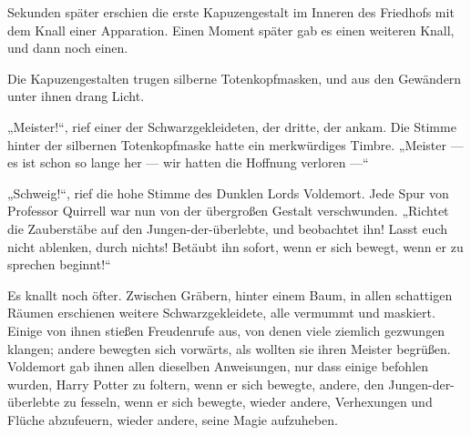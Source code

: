 Sekunden später erschien die erste Kapuzengestalt im Inneren des Friedhofs mit dem Knall einer Apparation. Einen Moment später gab es einen weiteren Knall, und dann noch einen.

Die Kapuzengestalten trugen silberne Totenkopfmasken, und aus den Gewändern unter ihnen drang Licht.

„Meister!“, rief einer der Schwarzgekleideten, der dritte, der ankam. Die Stimme hinter der silbernen Totenkopfmaske hatte ein merkwürdiges Timbre.
„Meister — es ist schon so lange her — wir hatten die Hoffnung verloren —“

„Schweig!“, rief die hohe Stimme des Dunklen Lords Voldemort.
Jede Spur von Professor Quirrell war nun von der übergroßen Gestalt verschwunden.
„Richtet die Zauberstäbe auf den Jungen-der-überlebte, und beobachtet ihn! Lasst euch nicht ablenken, durch nichts! Betäubt ihn sofort, wenn er sich bewegt, wenn er zu sprechen beginnt!“

Es knallt noch öfter. Zwischen Gräbern, hinter einem Baum, in allen schattigen Räumen erschienen weitere Schwarzgekleidete, alle vermummt und maskiert. Einige von ihnen stießen Freudenrufe aus, von denen viele ziemlich gezwungen klangen; andere bewegten sich vorwärts, als wollten sie ihren Meister begrüßen. Voldemort gab ihnen allen dieselben Anweisungen, nur dass einige befohlen wurden, Harry Potter zu foltern, wenn er sich bewegte, andere, den Jungen-der-überlebte zu fesseln, wenn er sich bewegte, wieder andere, Verhexungen und Flüche abzufeuern, wieder andere, seine Magie aufzuheben.

